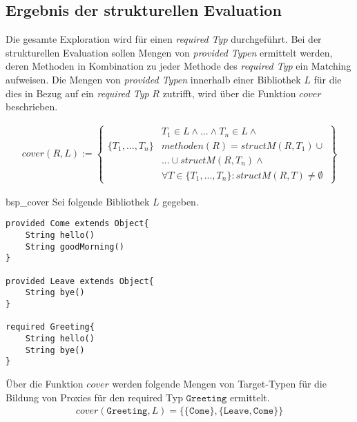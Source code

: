 \subsection{Ergebnis der strukturellen Evaluation}\label{sec_ergStructEval}
Die gesamte Exploration wird für einen \emph{required Typ} durchgeführt. Bei der strukturellen Evaluation sollen Mengen von \emph{provided Typen} ermittelt werden, deren Methoden in Kombination zu jeder Methode des \emph{required Typ} ein Matching aufweisen. Die Mengen von \emph{provided Typen} innerhalb einer Bibliothek $L$ für die dies in Bezug auf ein \emph{required Typ} $R$ zutrifft, wird über die Funktion $cover$ beschrieben.

\begin{gather*}
cover(R,L) := 
\left\{\begin{array}{l|l}
					& T_1 \in L \wedge \text{...} \wedge T_n \in L 								\wedge \mathit{ }\\
\{T_1,...,T_n\}		& \mathit{methoden(R)} = \mathit{structM(R,T_1)}							\cup \mathit{ }\\
					& \texttt{...} \cup \mathit{structM(R, T_n)} 								\wedge \mathit{ }\\
					& \forall T \in \{T_1,...,T_n\}:											\mathit{structM(R,T)} \neq \emptyset
\end{array}\right\}
\end{gather*}

\begin{example}{bsp_cover}
Sei folgende Bibliothek $L$ gegeben.
\begin{lstlisting}[style = dsl]
provided Come extends Object{
	String hello()
	String goodMorning()
}

provided Leave extends Object{
	String bye()
}

required Greeting{
	String hello()
	String bye()
}
\end{lstlisting}
Über die Funktion $\mathit{cover}$ werden folgende Mengen von Target-Typen für die Bildung von Proxies für den required Typ $\texttt{Greeting}$ ermittelt.
\begin{gather*}
\mathit{cover(\texttt{Greeting},L)} = \{
	\{\texttt{Come}\},\{\texttt{Leave}, \texttt{Come}\}
\}
\end{gather*}
\end{example}

